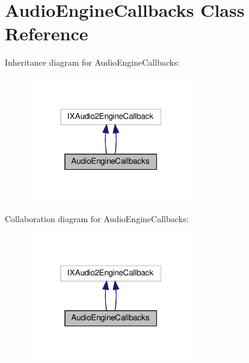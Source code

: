 \hypertarget{classAudioEngineCallbacks}{}\section{Audio\+Engine\+Callbacks Class Reference}
\label{classAudioEngineCallbacks}


Inheritance diagram for Audio\+Engine\+Callbacks\+:
\nopagebreak
\begin{figure}[H]
\begin{center}
\leavevmode
\includegraphics[width=205pt]{classAudioEngineCallbacks__inherit__graph}
\end{center}
\end{figure}


Collaboration diagram for Audio\+Engine\+Callbacks\+:
\nopagebreak
\begin{figure}[H]
\begin{center}
\leavevmode
\includegraphics[width=205pt]{classAudioEngineCallbacks__coll__graph}
\end{center}
\end{figure}
